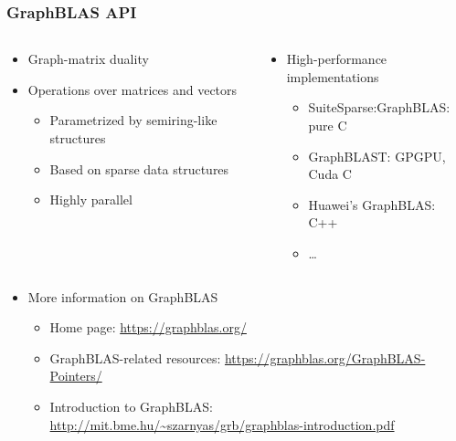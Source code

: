 \documentclass[xcolor=table,aspectratio=169]{beamer}
\begin{document}
\begin{frame}[fragile]
  \frametitle{GraphBLAS API}
  \begin{columns}[t]
    \begin{column}{0.45\textwidth}
  \begin{itemize}
    \item Graph-matrix duality
    \item Operations over matrices and vectors
    \begin{itemize}
      \item Parametrized by semiring-like structures
      \item Based on sparse data structures
      \item Highly parallel
    \end{itemize}    
  \end{itemize}
\end{column}
\pause
\begin{column}{0.55\textwidth}
  \begin{itemize}
  \item High-performance implementations
    \begin{itemize}
      \item SuiteSparse:GraphBLAS\footnotemark[1]: pure C
      \item GraphBLAST\footnotemark[2]: GPGPU, Cuda C
      \item Huawei's GraphBLAS\footnotemark[3]: C++
      \item \ldots
    \end{itemize}
  \end{itemize}
\end{column}
\end{columns}
\pause
\begin{itemize}
  \item More information on GraphBLAS
  \begin{itemize}
    \item Home page: \url{https://graphblas.org/}
    \item GraphBLAS-related resources: \url{https://graphblas.org/GraphBLAS-Pointers/}
    \item Introduction to GraphBLAS: \url{http://mit.bme.hu/~szarnyas/grb/graphblas-introduction.pdf}     
  \end{itemize}    
\end{itemize}
\end{frame}
\end{document}
